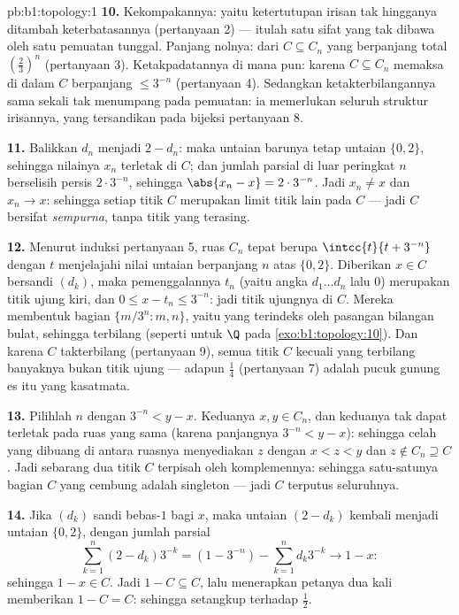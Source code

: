 \begin{solution}{pb:b1:topology:1}
\textbf{10.} Kekompakannya: yaitu ketertutupan irisan tak hingganya
ditambah keterbatasannya (pertanyaan 2) --- itulah satu sifat
yang tak dibawa oleh satu pemuatan tunggal. Panjang nolnya: dari $C \subseteq
C_n$ yang berpanjang total $(\frac23)^n$ (pertanyaan 3). Ketakpadatannya
di mana pun: karena $C \subseteq C_n$ memaksa  di dalam $C$ berpanjang
$\leq 3^{-n}$ (pertanyaan 4). Sedangkan ketakterbilangannya sama sekali tak menumpang pada
pemuatan: ia memerlukan seluruh struktur irisannya, yang
tersandikan pada bijeksi pertanyaan 8.

\textbf{11.} Balikkan $d_n$ menjadi $2 - d_n$: maka untaian barunya tetap
untaian $\{0,2\}$, sehingga nilainya $x_n$ terletak di $C$; dan jumlah
parsial di luar peringkat $n$ berselisih persis $2\cdot3^{-n}$, sehingga
$\abs{x_n - x} = 2\cdot3^{-n}$. Jadi $x_n \neq x$ dan $x_n \to
x$: sehingga setiap titik $C$ merupakan limit titik lain pada $C$ --- jadi $C$
bersifat \emph{sempurna}, tanpa titik yang terasing.

\textbf{12.} Menurut induksi pertanyaan 5, ruas
$C_n$ tepat berupa $\intcc{t}{t + 3^{-n}}$ dengan $t$ menjelajahi
nilai untaian berpanjang $n$ atas $\{0,2\}$. Diberikan $x \in C$
bersandi $(d_k)$, maka pemenggalannya $t_n$ (yaitu angka $d_1 \dots d_n$
lalu $0$) merupakan titik ujung kiri, dan $0 \leq x - t_n
\leq 3^{-n}$: jadi titik ujungnya  di $C$. Mereka membentuk  bagian
$\{m/3^n : m, n\}$, yaitu  yang terindeks oleh pasangan bilangan bulat, sehingga
terbilang (seperti untuk $\Q$ pada \cref{exo:b1:topology:10}). Dan karena $C$
takterbilang (pertanyaan 9), semua titik $C$ kecuali yang terbilang banyaknya
bukan titik ujung --- adapun $\frac14$ (pertanyaan 7) adalah pucuk
gunung es itu yang kasatmata.

\textbf{13.} Pilihlah $n$ dengan $3^{-n} < y - x$. Keduanya $x, y \in
C_n$, dan keduanya tak dapat terletak pada ruas yang sama (karena panjangnya $3^{-n} <
y - x$): sehingga celah yang dibuang di antara ruasnya menyediakan $z$
dengan $x < z < y$ dan $z \notin C_n \supseteq C$. Jadi sebarang dua
titik $C$ terpisah oleh komplemennya: sehingga satu-satunya  bagian
$C$ yang cembung adalah singleton --- jadi $C$ terputus seluruhnya.

\textbf{14.} Jika $(d_k)$ sandi bebas-$1$ bagi $x$, maka untaian
$(2 - d_k)$ kembali menjadi untaian $\{0,2\}$, dengan jumlah parsial
\[
\sum_{k=1}^{n} (2 - d_k)3^{-k} = (1 - 3^{-n}) - \sum_{k=1}^n
d_k 3^{-k} \longrightarrow 1 - x :
\]
sehingga $1 - x \in C$. Jadi $1 - C \subseteq C$, lalu menerapkan petanya
dua kali memberikan $1 - C = C$: sehingga  setangkup terhadap
$\frac12$.


\end{solution}
